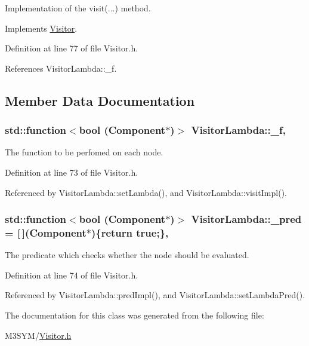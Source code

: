 Implementation of the visit(...) method. 



Implements \hyperlink{classVisitor_a1ebdba266c77626f67a22fc2300d8dc3}{Visitor}.



Definition at line 77 of file Visitor.\+h.



References Visitor\+Lambda\+::\+\_\+f.



\subsection{Member Data Documentation}
\hypertarget{classVisitorLambda_a098597c2b62c63a2fd2a833add3cc43d}{
\subsubsection[{\+\_\+f}]{\setlength{\rightskip}{0pt plus 5cm}std\+::function$<$bool ({\bf Component}$\ast$)$>$ Visitor\+Lambda\+::\+\_\+f\hspace{0.3cm}{\ttfamily [protected]}, {\ttfamily [inherited]}}}\label{classVisitorLambda_a098597c2b62c63a2fd2a833add3cc43d}


The function to be perfomed on each node. 



Definition at line 73 of file Visitor.\+h.



Referenced by Visitor\+Lambda\+::set\+Lambda(), and Visitor\+Lambda\+::visit\+Impl().

\hypertarget{classVisitorLambda_adfd5fc76108d52d9abc981c020379661}{
\subsubsection[{\+\_\+pred}]{\setlength{\rightskip}{0pt plus 5cm}std\+::function$<$bool ({\bf Component}$\ast$)$>$ Visitor\+Lambda\+::\+\_\+pred = \mbox{[}$\,$\mbox{]}({\bf Component}$\ast$)\{return true;\}\hspace{0.3cm}{\ttfamily [protected]}, {\ttfamily [inherited]}}}\label{classVisitorLambda_adfd5fc76108d52d9abc981c020379661}


The predicate which checks whether the node should be evaluated. 



Definition at line 74 of file Visitor.\+h.



Referenced by Visitor\+Lambda\+::pred\+Impl(), and Visitor\+Lambda\+::set\+Lambda\+Pred().



The documentation for this class was generated from the following file\+:\begin{DoxyCompactItemize}
\item 
M3\+S\+Y\+M/\hyperlink{Visitor_8h}{Visitor.\+h}\end{DoxyCompactItemize}
